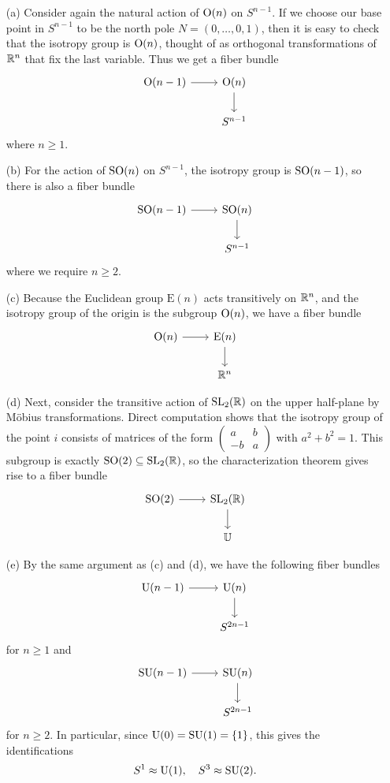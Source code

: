 \begin{example}\label{Lie group fiber bundle eg}
\mbox{}
\begin{itemize}
\item[(a)] Consider again the natural action of $\mathrm{O}(n)$ on $S^{n-1}$. If we choose our base point in $S^{n-1}$ to be the north pole $N=(0,\dots,0,1)$, then it is easy to check that the isotropy group is $\mathrm{O}(n)$, thought of as orthogonal transformations of $\mathbb{R}^n$ that fix the last variable. Thus we get a fiber bundle
\[\begin{tikzcd}
\O(n-1)\ar[r]&\O(n)\ar[d]\\
&S^{n-1}
\end{tikzcd}\]
where $n\geq 1$.
\item[(b)] For the action of $\mathrm{SO}(n)$ on $S^{n-1}$, the isotropy group is $\mathrm{SO}(n-1)$, so there is also a fiber bundle
\[\begin{tikzcd}
\SO(n-1)\ar[r]&\SO(n)\ar[d]\\
&S^{n-1}
\end{tikzcd}\]
where we require $n\geq 2$.
\item[(c)] Because the Euclidean group $\mathrm{E}(n)$ acts transitively on $\mathbb{R}^n$, and the isotropy group of the origin is the subgroup $\mathrm{O}(n)$, we have a fiber bundle
\[\begin{tikzcd}
\O(n)\ar[r]&\mathrm{E}(n)\ar[d]\\
&\R^n
\end{tikzcd}\] 
\item[(d)] Next, consider the transitive action of $\mathrm{SL}_2(\mathbb{R})$ on the upper half-plane by M\"obius transformations. Direct computation shows that the isotropy group of the point $i$ consists of matrices of the form $(\begin{smallmatrix}
a&b\\
-b&a
\end{smallmatrix})$ with $a^2+b^2=1$. This subgroup is exactly $\mathrm{SO}(2)\subseteq\mathrm{SL}_2(\mathbb{R})$, so the characterization theorem gives rise to a fiber bundle
\[\begin{tikzcd}
\SO(2)\ar[r]&\SL_2(\R)\ar[d]\\
&\mathbb{U}
\end{tikzcd}\]
\item[(e)] By the same argument as (c) and (d), we have the following fiber bundles 
\[\begin{tikzcd}
\U(n-1)\ar[r]&\U(n)\ar[d]\\
&S^{2n-1}
\end{tikzcd}\]
for $n\geq 1$ and
\[\begin{tikzcd}
\SU(n-1)\ar[r]&\SU(n)\ar[d]\\
&S^{2n-1}
\end{tikzcd}\]
for $n\geq 2$. In particular, since $\mathrm{U}(0)=\mathrm{SU}(1)=\{1\}$, this gives the identifications
\[S^1\approx\mathrm{U}(1),\quad S^3\approx\mathrm{SU}(2).\]
\end{itemize}
\end{example}
